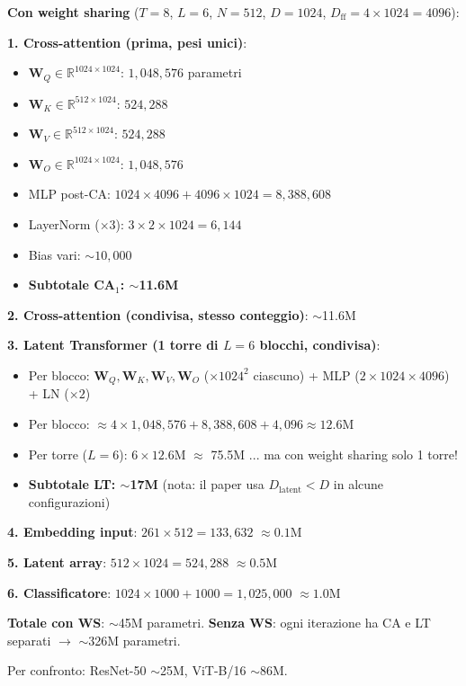\documentclass[12pt,a4paper]{article}
\begin{document}
\begin{examplebox}

\textbf{Con weight sharing} ($T = 8$, $L = 6$, $N = 512$, $D = 1024$, $D_{\text{ff}} = 4 \times 1024 = 4096$):

\textbf{1. Cross-attention (prima, pesi unici)}:
\begin{itemize}
    \item $\mathbf{W}_Q \in \mathbb{R}^{1024 \times 1024}$: $1{,}048{,}576$ parametri
    \item $\mathbf{W}_K \in \mathbb{R}^{512 \times 1024}$: $524{,}288$
    \item $\mathbf{W}_V \in \mathbb{R}^{512 \times 1024}$: $524{,}288$
    \item $\mathbf{W}_O \in \mathbb{R}^{1024 \times 1024}$: $1{,}048{,}576$
    \item MLP post-CA: $1024 \times 4096 + 4096 \times 1024 = 8{,}388{,}608$
    \item LayerNorm ($\times 3$): $3 \times 2 \times 1024 = 6{,}144$
    \item Bias vari: $\sim 10{,}000$
    \item \textbf{Subtotale CA$_1$: $\sim$11.6M}
\end{itemize}

\textbf{2. Cross-attention (condivisa, stesso conteggio)}: $\sim$11.6M

\textbf{3. Latent Transformer (1 torre di $L = 6$ blocchi, condivisa)}:
\begin{itemize}
    \item Per blocco: $\mathbf{W}_Q, \mathbf{W}_K, \mathbf{W}_V, \mathbf{W}_O$ ($\times 1024^2$ ciascuno) + MLP ($2 \times 1024 \times 4096$) + LN ($\times 2$)
    \item Per blocco: $\approx 4 \times 1{,}048{,}576 + 8{,}388{,}608 + 4{,}096 \approx 12.6$M
    \item Per torre ($L = 6$): $6 \times 12.6$M $\approx$ 75.5M ... ma con weight sharing solo 1 torre!
    \item \textbf{Subtotale LT: $\sim$17M} (nota: il paper usa $D_{\text{latent}} < D$ in alcune configurazioni)
\end{itemize}

\textbf{4. Embedding input}: $261 \times 512 = 133{,}632$ $\approx 0.1$M

\textbf{5. Latent array}: $512 \times 1024 = 524{,}288$ $\approx 0.5$M

\textbf{6. Classificatore}: $1024 \times 1000 + 1000 = 1{,}025{,}000$ $\approx 1.0$M

\textbf{Totale con WS}: $\sim$45M parametri.
\textbf{Senza WS}: ogni iterazione ha CA e LT separati $\to$ $\sim$326M parametri.

Per confronto: ResNet-50 $\sim$25M, ViT-B/16 $\sim$86M.
\end{examplebox}
\end{document}
